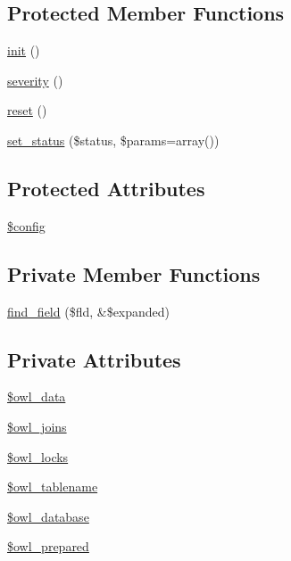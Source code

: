 \subsection*{Protected Member Functions}
\begin{CompactItemize}
\item 
\hyperlink{class__OWL_e0ef3ded56e8a6b34b6461e5a721cd3e}{init} ()
\item 
\hyperlink{class__OWL_5b88d497ccf2305fa411b9bd3f4bfe6f}{severity} ()
\item 
\hyperlink{class__OWL_2f2a042bcf31965194c03033df0edc9b}{reset} ()
\item 
\hyperlink{class__OWL_ea912d0ede9b3c2a69b79072d94d4787}{set\_\-status} (\$status, \$params=array())
\end{CompactItemize}
\subsection*{Protected Attributes}
\begin{CompactItemize}
\item 
\hyperlink{class__OWL_f37a011667dda12fc417a68a6f3077d1}{\$config}
\end{CompactItemize}
\subsection*{Private Member Functions}
\begin{CompactItemize}
\item 
\hyperlink{classDataHandler_1e4789e22370c96ae479bc3a58f30984}{find\_\-field} (\$fld, \&\$expanded)
\end{CompactItemize}
\subsection*{Private Attributes}
\begin{CompactItemize}
\item 
\hyperlink{classDataHandler_329b5524c379e0db6c4d5ce59f3c414f}{\$owl\_\-data}
\item 
\hyperlink{classDataHandler_da9b697f81ea82d269077f9c7445791d}{\$owl\_\-joins}
\item 
\hyperlink{classDataHandler_8c362014ccc2c85335cc56afe3966ee6}{\$owl\_\-locks}
\item 
\hyperlink{classDataHandler_24620784bde262bdd02227962d3b9605}{\$owl\_\-tablename}
\item 
\hyperlink{classDataHandler_3ac49aa018e0ebe4c74f5a636d455a8b}{\$owl\_\-database}
\item 
\hyperlink{classDataHandler_e6093d21291ed3ab3183e11962452928}{\$owl\_\-prepared}
\end{CompactItemize}



